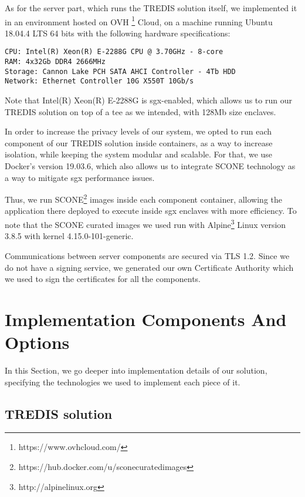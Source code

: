 As for the server part, which runs the TREDIS solution itself, we implemented it in an environment hosted on OVH \footnote{https://www.ovhcloud.com/} Cloud, on a machine running Ubuntu 18.04.4 LTS 64 bits with the following hardware specifications: 
\vspace{5mm}
\begin{lstlisting}
CPU: Intel(R) Xeon(R) E-2288G CPU @ 3.70GHz - 8-core
RAM: 4x32Gb DDR4 2666MHz 
Storage: Cannon Lake PCH SATA AHCI Controller - 4Tb HDD
Network: Ethernet Controller 10G X550T 10Gb/s
\end{lstlisting}
\vspace{3mm}

Note that Intel(R) Xeon(R) E-2288G is \gls{sgx}-enabled, which allows us to run our TREDIS solution on top of a \gls{tee} as we intended, with 128Mb size enclaves. 

In order to increase the privacy levels of our system, we opted to run each component of our TREDIS solution inside containers, as a way to increase isolation, while keeping the system modular and scalable. 
For that, we use Docker's version 19.03.6, which also allows us to integrate SCONE technology as a way to mitigate \gls{sgx} performance issues. 

Thus, we run SCONE\footnote{https://hub.docker.com/u/sconecuratedimages} images  inside each component container, allowing the application there deployed to execute inside \gls{sgx} enclaves with more efficiency. 
To note that the SCONE curated images we used run with Alpine\footnote{http://alpinelinux.org} Linux version 3.8.5 with kernel 4.15.0-101-generic.

Communications between server components are secured via TLS 1.2. Since we do not have a signing service, we generated our own Certificate Authority which we used to sign the certificates for all the components. 



\section{Implementation Components And Options}
\label{sec:implementationComponents}

In this Section, we go deeper into implementation details of our solution, specifying the technologies we used to implement each piece of it.


\subsection{TREDIS solution}


